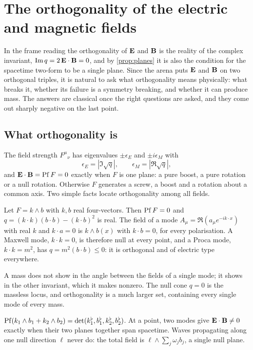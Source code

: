 \section{The orthogonality of the electric and magnetic fields}
\label{sec:orth}

In the frame reading the orthogonality of $\mathbf E$ and $\mathbf B$ is the reality of the complex invariant, $\operatorname{Im} q=2\,\mathbf E\cdot\mathbf B=0$, and
by \cref{prop:planes} it is also the condition for the spacetime two-form to be a single plane. Since the arena puts $\mathbf E$ and $\mathbf B$
on two orthogonal triples, it is natural to ask what orthogonality means physically: what breaks it, whether its failure is a
symmetry breaking, and whether it can produce mass. The answers are classical once the right questions are asked, and they come out
sharply negative on the last point.

\subsection{What orthogonality is}

The field strength $F^\mu{}_\nu$ has eigenvalues $\pm\epsilon_E$ and $\pm i\epsilon_M$ with
\[
\epsilon_E=|\Im\sqrt q|,\qquad \epsilon_M=|\Re\sqrt q|,
\]
and $\mathbf E\cdot\mathbf B=\operatorname{Pf} F=0$ exactly when $F$ is one plane: a pure boost, a pure rotation or a null rotation. Otherwise $F$ generates a
screw, a boost and a rotation about a common axis. Two simple facts locate orthogonality among all fields.

\begin{proposition}
\label{prop:modes}
Let $F=k\wedge b$ with $k,b$ real four-vectors. Then $\operatorname{Pf} F=0$ and $q=(k\cdot k)(b\cdot b)-(k\cdot b)^2$ is real. The field of a mode
$A_\mu=\Re(a_\mu e^{-ik\cdot x})$ with real $k$ and $k\cdot a=0$ is $k\wedge b(x)$ with $k\cdot b=0$, for every polarisation. A Maxwell mode,
$k\cdot k=0$, is therefore null at every point, and a Proca mode, $k\cdot k=m^2$, has $q=m^2(b\cdot b)\le0$: it is orthogonal and of
electric type everywhere.
\end{proposition}

A mass does not show in the angle between the fields of a single mode; it shows in the other invariant, which it makes nonzero.
The null cone $q=0$ is the massless locus, and orthogonality is a much larger set, containing every single mode of every mass.

\begin{proposition}
\label{prop:twomodes}
$\operatorname{Pf}(k_1\wedge b_1+k_2\wedge b_2)=\det(k_1^\flat,b_1^\flat,k_2^\flat,b_2^\flat)$. At a point, two modes give $\mathbf E\cdot\mathbf B\neq0$ exactly when
their two planes together span spacetime. Waves propagating along one null direction $\ell$ never do: the total field is
$\ell\wedge\sum_j\omega_jb_j$, a single null plane.
\end{proposition}

